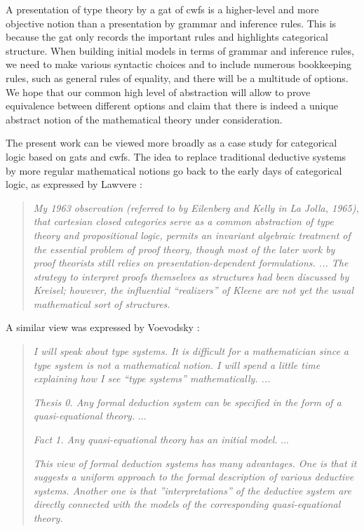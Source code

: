 \documentclass[11pt,a4paper]{article}
\theoremstyle{plain}
\theoremstyle{definition}
\begin{document}
A presentation of type theory by a gat of cwfs is a higher-level and more objective notion than a presentation by grammar and inference rules. This is because the gat only records the important rules and highlights categorical structure. When building initial models in terms of grammar and inference rules, we need to make various syntactic choices and to include numerous bookkeeping rules, such as general rules of equality, and there will be a multitude of options. We hope that our common high level of abstraction will allow to prove equivalence between different options and claim that there is indeed a unique abstract notion of the mathematical theory under consideration.

The present work can be viewed more broadly as a case study for categorical logic based on gats and cwfs. The idea to replace traditional deductive systems by more regular mathematical notions go back to the early days of categorical logic, as expressed by Lawvere \cite{lawvere:tac-adjointness}:
\begin{quotation}
\emph{
My 1963 observation (referred to by Eilenberg and Kelly in La Jolla, 1965), that cartesian closed categories serve as a common abstraction of type theory and propositional
logic, permits an invariant algebraic treatment of the essential problem of proof theory,
though most of the later work by proof theorists still relies on presentation-dependent
formulations. ... The strategy to interpret proofs themselves as structures had
been discussed by Kreisel; however, the influential “realizers” of Kleene are not yet the
usual mathematical sort of structures.
}
\end{quotation}
A similar view was expressed by Voevodsky \cite{voevodsky:cmu2010}:
\begin{quotation}
\emph{
I will speak about type systems. It is diﬃcult for a mathematician since
a type system is not a mathematical notion. I will spend a little time
explaining how I see ``type systems” mathematically. ...}

\emph{Thesis 0. Any formal deduction system can be specified in the form of a
quasi-equational theory.} ...

\emph{Fact 1. Any quasi-equational theory has an initial model.} ...

\emph{This view of formal deduction systems has many advantages. One is that it
suggests a uniform approach to the formal description of various deductive
systems. Another one is that ”interpretations” of the deductive system are
directly connected with the models of the corresponding quasi-equational
theory.}
\end{quotation}
\end{document}
